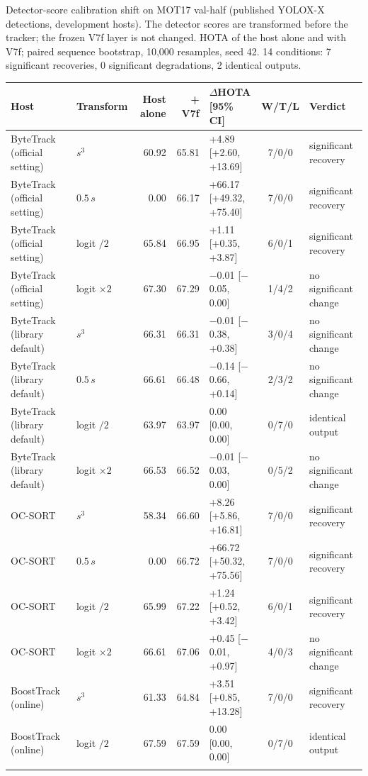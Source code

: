 \begin{tableorg}[!htbp]
\centering
\caption{Detector-score calibration shift on MOT17 val-half (published YOLOX-X detections, development hosts). The detector scores are transformed before the tracker; the frozen V7f layer is not changed. HOTA of the host alone and with V7f; paired sequence bootstrap, 10,000 resamples, seed 42. 14 conditions: 7 significant recoveries, 0 significant degradations, 2 identical outputs.}
\label{tab:calib}
\footnotesize
\setlength\tabcolsep{3.5pt}
\begin{adjustbox}{max width=\linewidth}
\begin{tabular}{llrrlcl}
\toprule
Host & Transform & Host alone & + V7f & $\Delta$HOTA [95\% CI] & W/T/L & Verdict \\
\midrule
ByteTrack (official setting) & $s^3$ & 60.92 & 65.81 & +4.89 [+2.60, +13.69] & 7/0/0 & significant recovery \\
ByteTrack (official setting) & $0.5\,s$ & 0.00 & 66.17 & +66.17 [+49.32, +75.40] & 7/0/0 & significant recovery \\
ByteTrack (official setting) & logit $/2$ & 65.84 & 66.95 & +1.11 [+0.35, +3.87] & 6/0/1 & significant recovery \\
ByteTrack (official setting) & logit $\times 2$ & 67.30 & 67.29 & \ensuremath{-}0.01 [\ensuremath{-}0.05, 0.00] & 1/4/2 & no significant change \\
ByteTrack (library default) & $s^3$ & 66.31 & 66.31 & \ensuremath{-}0.01 [\ensuremath{-}0.38, +0.38] & 3/0/4 & no significant change \\
ByteTrack (library default) & $0.5\,s$ & 66.61 & 66.48 & \ensuremath{-}0.14 [\ensuremath{-}0.66, +0.14] & 2/3/2 & no significant change \\
ByteTrack (library default) & logit $/2$ & 63.97 & 63.97 & 0.00 [0.00, 0.00] & 0/7/0 & identical output \\
ByteTrack (library default) & logit $\times 2$ & 66.53 & 66.52 & \ensuremath{-}0.01 [\ensuremath{-}0.03, 0.00] & 0/5/2 & no significant change \\
OC-SORT & $s^3$ & 58.34 & 66.60 & +8.26 [+5.86, +16.81] & 7/0/0 & significant recovery \\
OC-SORT & $0.5\,s$ & 0.00 & 66.72 & +66.72 [+50.32, +75.56] & 7/0/0 & significant recovery \\
OC-SORT & logit $/2$ & 65.99 & 67.22 & +1.24 [+0.52, +3.42] & 6/0/1 & significant recovery \\
OC-SORT & logit $\times 2$ & 66.61 & 67.06 & +0.45 [\ensuremath{-}0.01, +0.97] & 4/0/3 & no significant change \\
BoostTrack (online) & $s^3$ & 61.33 & 64.84 & +3.51 [+0.85, +13.28] & 7/0/0 & significant recovery \\
BoostTrack (online) & logit $/2$ & 67.59 & 67.59 & 0.00 [0.00, 0.00] & 0/7/0 & identical output \\
\botrule
\end{tabular}
\end{adjustbox}
\end{tableorg}

